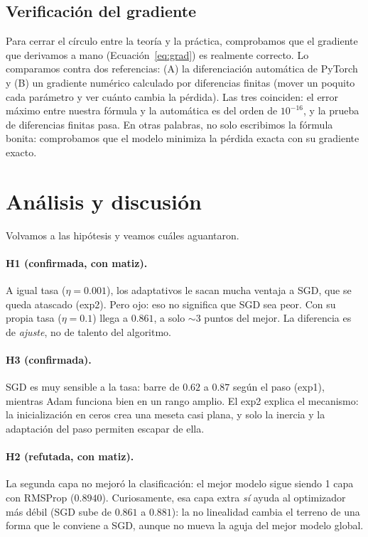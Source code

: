 \documentclass[11pt]{article}
\begin{document}
\subsection{Verificación del gradiente}\label{sec:gradcheck}
Para cerrar el círculo entre la teoría y la práctica, comprobamos que el gradiente que
derivamos a mano (Ecuación~\eqref{eq:grad}) es realmente correcto. Lo comparamos contra dos
referencias: (A) la diferenciación automática de PyTorch y (B) un gradiente numérico calculado
por diferencias finitas (mover un poquito cada parámetro y ver cuánto cambia la pérdida). Las
tres coinciden: el error máximo entre nuestra fórmula y la automática es del orden de
$10^{-16}$, y la prueba de diferencias finitas pasa. En otras palabras, no solo escribimos la
fórmula bonita: comprobamos que el modelo minimiza la pérdida exacta con su gradiente exacto.

\section{Análisis y discusión}\label{sec:analisis}
Volvamos a las hipótesis y veamos cuáles aguantaron.

\paragraph{H1 (confirmada, con matiz).} A igual tasa ($\eta=0.001$), los adaptativos le sacan
mucha ventaja a SGD, que se queda atascado (exp2). Pero ojo: eso no significa que SGD sea peor.
Con su propia tasa ($\eta=0.1$) llega a $0.861$, a solo $\sim$3 puntos del mejor. La diferencia
es de \emph{ajuste}, no de talento del algoritmo.

\paragraph{H3 (confirmada).} SGD es muy sensible a la tasa: barre de $0.62$ a $0.87$ según el
paso (exp1), mientras Adam funciona bien en un rango amplio. El exp2 explica el mecanismo: la
inicialización en ceros crea una meseta casi plana, y solo la inercia y la adaptación del paso
permiten escapar de ella.

\paragraph{H2 (refutada, con matiz).} La segunda capa no mejoró la clasificación: el mejor
modelo sigue siendo 1 capa con RMSProp ($0.8940$). Curiosamente, esa capa extra \emph{sí}
ayuda al optimizador más débil (SGD sube de $0.861$ a $0.881$): la no linealidad cambia el
terreno de una forma que le conviene a SGD, aunque no mueva la aguja del mejor modelo global.
\end{document}
